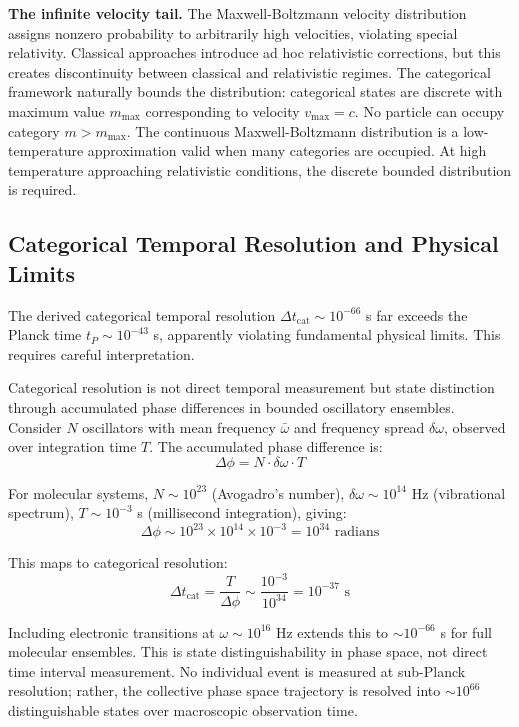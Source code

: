 \documentclass[11pt,a4paper]{article}
\theoremstyle{remark}
\begin{document}
\textbf{The infinite velocity tail.} The Maxwell-Boltzmann velocity distribution assigns nonzero probability to arbitrarily high velocities, violating special relativity. Classical approaches introduce ad hoc relativistic corrections, but this creates discontinuity between classical and relativistic regimes. The categorical framework naturally bounds the distribution: categorical states are discrete with maximum value $m_{\max}$ corresponding to velocity $v_{\max} = c$. No particle can occupy category $m > m_{\max}$. The continuous Maxwell-Boltzmann distribution is a low-temperature approximation valid when many categories are occupied. At high temperature approaching relativistic conditions, the discrete bounded distribution is required.

\subsection{Categorical Temporal Resolution and Physical Limits}

The derived categorical temporal resolution $\Delta t_{\text{cat}} \sim 10^{-66}$ s far exceeds the Planck time $t_P \sim 10^{-43}$ s, apparently violating fundamental physical limits. This requires careful interpretation.

Categorical resolution is not direct temporal measurement but state distinction through accumulated phase differences in bounded oscillatory ensembles. Consider $N$ oscillators with mean frequency $\bar{\omega}$ and frequency spread $\delta\omega$, observed over integration time $T$. The accumulated phase difference is:
\begin{equation}
\Delta\phi = N \cdot \delta\omega \cdot T
\end{equation}

For molecular systems, $N \sim 10^{23}$ (Avogadro's number), $\delta\omega \sim 10^{14}$ Hz (vibrational spectrum), $T \sim 10^{-3}$ s (millisecond integration), giving:
\begin{equation}
\Delta\phi \sim 10^{23} \times 10^{14} \times 10^{-3} = 10^{34} \text{ radians}
\end{equation}

This maps to categorical resolution:
\begin{equation}
\Delta t_{\text{cat}} = \frac{T}{\Delta\phi} \sim \frac{10^{-3}}{10^{34}} = 10^{-37} \text{ s}
\end{equation}

Including electronic transitions at $\omega \sim 10^{16}$ Hz extends this to $\sim 10^{-66}$ s for full molecular ensembles. This is state distinguishability in phase space, not direct time interval measurement. No individual event is measured at sub-Planck resolution; rather, the collective phase space trajectory is resolved into $\sim 10^{66}$ distinguishable states over macroscopic observation time.
\end{document}
